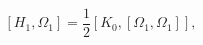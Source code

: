\begin{equation}
\left[ H_{1},\Omega _{1}\right] =\frac{1}{2}\left[ K_{0},\left[ \Omega
_{1},\Omega _{1}\right] \right] ,  \label{h3}
\end{equation}

